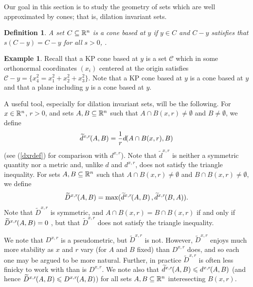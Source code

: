 \documentclass[11pt]{article}
\newtheorem{definition}[theorem]{Definition}
\theoremstyle{definition}
\newtheorem*{example}{Example}
\numberwithin{equation}{section}
\newcommand{\cC}{\mathcal{C}}
\newcommand{\D}[3]{D^{#1}\hspace{-3 pt}\left(#2,#3\right)}
\newcommand{\Da}[3]{\twid{D}^{#1}\hspace{-3 pt}\left(#2,#3\right)}
\newcommand{\hd}[3]{d^{#1}\hspace{-3 pt}\left(#2,#3\right)}
\newcommand{\hda}[3]{\twid{d}^{#1}\hspace{-3 pt}\left(#2,#3\right)}
\newcommand{\sleq}{\leqslant}
\newcommand{\twid}[1]{\widetilde{#1}}
\begin{document}
Our goal in this section is to study the geometry of sets which are well approximated by cones; that is, dilation invariant sets. 

\begin{definition}\emph{
A set $C\subseteq\mathbb{R}^n$ is a \emph{cone based at $y$} if $y\in C$ and $C-y$ satisfies that $s(C-y) = C-y$  for all $s>0$, .}
\end{definition}

\begin{example}
 Recall that a KP cone based at $y$ is a set $\cC$ which in some orthonormal coordinates $(x_i)$ centered at the origin satisfies
$\cC -y = \{x_4^2 = x_1^2 + x_2^2 + x_3^2\}.$
Note that a KP cone based at $y$ is a cone based at $y$ and that a plane including $y$ is a cone based at $y$.
\end{example}

A useful tool, especially for dilation invariant sets, will be the following. For $x\in \mathbb{R}^n$, $r>0$, and sets $A, B\subseteq \mathbb{R}^n$ such that $A\cap B(x,r)\neq \emptyset$ and $B\neq \emptyset$, we define
\begin{equation}\label{daxrdef}
\hda{x, r}A B = \frac 1 r \hd{}{A\cap B(x,r)}{B}
\end{equation}
(see (\ref{dxrdef}) for comparison with $d^{x,r}$). Note that $\twid d^{x,r}$ is neither a symmetric quantity nor a metric and, unlike $d$ and $d^{x,r}$, does not satisfy the triangle inequality. For sets $A, B\subseteq \mathbb{R}^n$ such that $A\cap B(x,r)\neq \emptyset$ and $B\cap B(x,r)\neq \emptyset$, we define 
\begin{equation}\label{Daxrdef}
\Da{x,r} A B = \max( \hda{x,r}A B , \hda{x,r} B A).
\end{equation}
Note that $\twid D^{x,r}$ is symmetric, and $A\cap B(x,r) = B\cap B(x,r)$ if and only if $\Da{x,r} A B = 0$ , but that $\twid D^{x,r}$ does not satisfy the triangle inequality.

We note that $D^{x,r}$ is a pseudometric, but $\twid D^{x,r}$ is not. However, $\twid D^{x,r}$ enjoys much more stability as $x$ and $r$ vary (for $A$ and $B$ fixed) than $D^{x,r}$ does, and so each one may be argued to be more natural. Further, in practice $\twid D^{x,r}$ is often less finicky to work with than is $D^{x,r}$.  We note also that $\hda{x,r}AB\sleq \hd{x,r}AB$ (and hence $\Da{x,r}AB\sleq\D{x,r}AB$) for all sets $A,B\subseteq\mathbb{R}^{n}$ interesecting $B(x,r)$.
\end{document}
